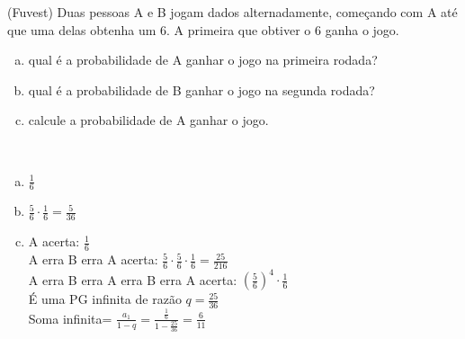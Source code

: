 \begin{ex}
(Fuvest) Duas pessoas A e B jogam dados alternadamente, começando com A até que uma delas obtenha um 6. A primeira que obtiver o 6 ganha o jogo.
   \begin{enumerate}[(a)]
   \item qual é a probabilidade de A ganhar o jogo na primeira rodada?
   \item qual é a probabilidade de B ganhar o jogo na segunda rodada?
   \item calcule a probabilidade de A ganhar o jogo.
   \end{enumerate}
     \begin{sol}
       \phantom{A} \\
         \begin{enumerate} [(a)]
             \item $\frac{1}{6}$
             \item $\frac{5}{6}\cdot\frac{1}{6}=\frac{5}{36}$
             \item A acerta: $\frac{1}{6}$ \\
             A erra B erra A acerta:  $\frac{5}{6}\cdot\frac{5}{6}\cdot\frac{1}{6}=\frac{25}{216}$\\
             A erra B erra A erra B erra A acerta:   $(\frac{5}{6})^4\cdot\frac{1}{6}$\\
             É uma PG infinita de razão $q=\frac{25}{36}$\\
             Soma infinita= $\frac{a_1}{1-q}=\frac{\frac{1}{6}}{1-\frac{25}{36}}=\frac{6}{11}$
             
       \end{enumerate}
     \end{sol}
\end{ex}